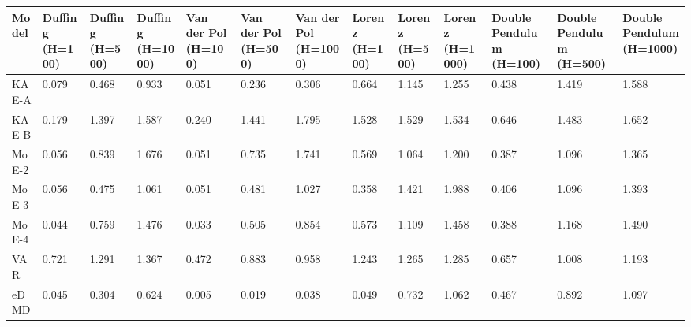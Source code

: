 \begin{tabular}{lllllllllllll}
\toprule
Model & Duffing (H=100) & Duffing (H=500) & Duffing (H=1000) & Van der Pol (H=100) & Van der Pol (H=500) & Van der Pol (H=1000) & Lorenz (H=100) & Lorenz (H=500) & Lorenz (H=1000) & Double Pendulum (H=100) & Double Pendulum (H=500) & Double Pendulum (H=1000) \\
\midrule
KAE-A & 0.079 & 0.468 & 0.933 & 0.051 & 0.236 & 0.306 & 0.664 & 1.145 & 1.255 & 0.438 & 1.419 & 1.588 \\
KAE-B & 0.179 & 1.397 & 1.587 & 0.240 & 1.441 & 1.795 & 1.528 & 1.529 & 1.534 & 0.646 & 1.483 & 1.652 \\
MoE-2 & 0.056 & 0.839 & 1.676 & 0.051 & 0.735 & 1.741 & 0.569 & 1.064 & 1.200 & 0.387 & 1.096 & 1.365 \\
MoE-3 & 0.056 & 0.475 & 1.061 & 0.051 & 0.481 & 1.027 & 0.358 & 1.421 & 1.988 & 0.406 & 1.096 & 1.393 \\
MoE-4 & 0.044 & 0.759 & 1.476 & 0.033 & 0.505 & 0.854 & 0.573 & 1.109 & 1.458 & 0.388 & 1.168 & 1.490 \\
VAR & 0.721 & 1.291 & 1.367 & 0.472 & 0.883 & 0.958 & 1.243 & 1.265 & 1.285 & 0.657 & 1.008 & 1.193 \\
eDMD & 0.045 & 0.304 & 0.624 & 0.005 & 0.019 & 0.038 & 0.049 & 0.732 & 1.062 & 0.467 & 0.892 & 1.097 \\
\bottomrule
\end{tabular}
